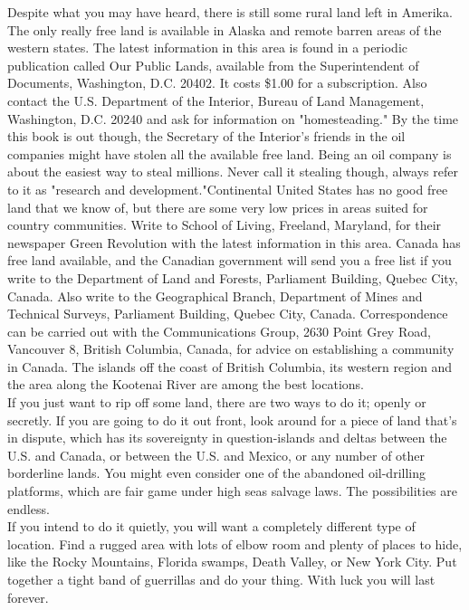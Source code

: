 \documentclass[11pt,twoside,a4paper]{book}
\begin{document}
Despite what you may have heard, there is still some rural land left in Amerika. The only really free land is available in Alaska and remote barren areas of the western states. The latest information in this area is found in a periodic publication called Our Public Lands, available from the Superintendent of Documents, Washington, D.C. 20402. It costs \$1.00 for a subscription. Also contact the U.S. Department of the Interior, Bureau of Land Management, Washington, D.C. 20240 and ask for information on "homesteading." By the time this book is out though, the Secretary of the Interior's friends in the oil companies might have stolen all the available free land. Being an oil company is about the easiest way to steal millions. Never call it stealing though, always refer to it as "research and development."Continental United States has no good free land that we know of, but there are some very low prices in areas suited for country communities. Write to School of Living, Freeland, Maryland, for their newspaper Green Revolution with the latest information in this area. Canada has free land available, and the Canadian government will send you a free list if you write to the Department of Land and Forests, Parliament Building, Quebec City, Canada. Also write to the Geographical Branch, Department of Mines and Technical Surveys, Parliament Building, Quebec City, Canada. Correspondence can be carried out with the Communications Group, 2630 Point Grey Road, Vancouver 8, British Columbia, Canada, for advice on establishing a community in Canada. The islands off the coast of British Columbia, its western region and the area along the Kootenai River are among the best locations.~\\

If you just want to rip off some land, there are two ways to do it; openly or secretly. If you are going to do it out front, look around for a piece of land that's in dispute, which has its sovereignty in question-islands and deltas between the U.S. and Canada, or between the U.S. and Mexico, or any number of other borderline lands. You might even consider one of the abandoned oil-drilling platforms, which are fair game under high seas salvage laws. The possibilities are endless.~\\

If you intend to do it quietly, you will want a completely different type of location. Find a rugged area with lots of elbow room and plenty of places to hide, like the Rocky Mountains, Florida swamps, Death Valley, or New York City. Put together a tight band of guerrillas and do your thing. With luck you will last forever.~\\
\end{document}

